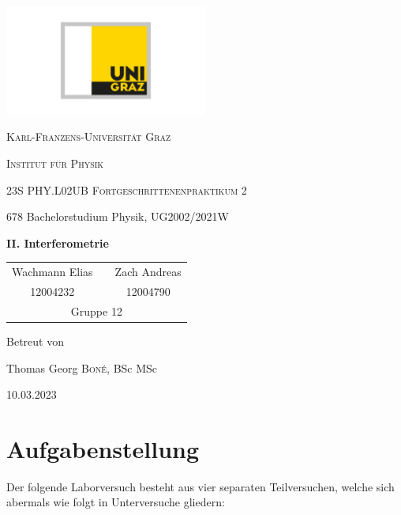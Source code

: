 \documentclass[ngerman]{scrartcl}
\begin{document}
\begin{titlepage}
    \centering
    \includegraphics[width=0.5\textwidth]{../../99_Misc/Logo_KF.pdf}\par\vspace{0.8cm}
    {\scshape\LARGE{Karl-Franzens-Universität Graz}\par}
    {\scshape\LARGE{Institut für Physik}\par}
    \vspace{1cm}
    {\scshape\Large{23S PHY.L02UB Fortgeschrittenenpraktikum 2}\par}
    678 Bachelorstudium Physik, UG2002/2021W\par
    \vspace{1.5cm}
    {\huge\bfseries II. Interferometrie\par}
    \vspace{2cm}
    \begin{table}[H]
        \centering
        \begin{tabular}{c c c}
            \Large Wachmann Elias &  & \Large Zach Andreas \\
            \Large 12004232       &  & \Large 12004790     \\
            \multicolumn{3}{c}{Gruppe 12}
        \end{tabular}
    \end{table}
    \vfill
    \Large Betreut von\par
    Thomas Georg \textsc{Boné}, BSc MSc
    \vfill
    {\large 10.03.2023\par}
\end{titlepage}

\clearpage
\tableofcontents
\newpage

\section[Aufgabenstellung]{Aufgabenstellung \cite{ref:angabe}}
\label{sec:aufgabenstellung}

Der folgende Laborversuch besteht aus vier separaten Teilversuchen, welche sich abermals wie folgt in Unterversuche gliedern:
\end{document}
